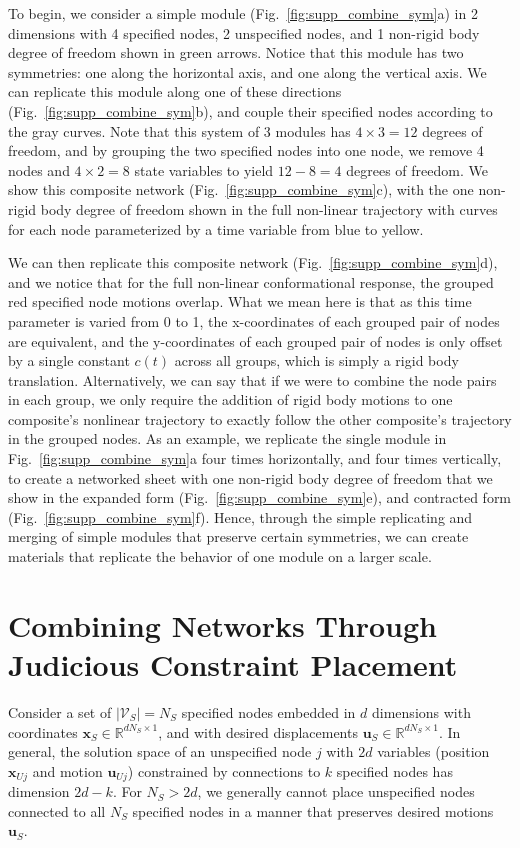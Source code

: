 \documentclass[%
preprint,
 amsmath,amssymb,
 aps,
]{revtex4-1}
\newcommand{\mc}{\mathcal}
\newcommand{\real}{\mathbb{R}}
\begin{document}
To begin, we consider a simple module (Fig.~\ref{fig:supp_combine_sym}a) in 2 dimensions with 4 specified nodes, 2 unspecified nodes, and 1 non-rigid body degree of freedom shown in green arrows. Notice that this module has two symmetries: one along the horizontal axis, and one along the vertical axis. We can replicate this module along one of these directions (Fig.~\ref{fig:supp_combine_sym}b), and couple their specified nodes according to the gray curves. Note that this system of 3 modules has $4 \times 3 = 12$ degrees of freedom, and by grouping the two specified nodes into one node, we remove 4 nodes and $4 \times 2 = 8$ state variables to yield $12 - 8 = 4$ degrees of freedom. We show this composite network (Fig.~\ref{fig:supp_combine_sym}c), with the one non-rigid body degree of freedom shown in the full non-linear trajectory with curves for each node parameterized by a time variable from blue to yellow. 

We can then replicate this composite network (Fig.~\ref{fig:supp_combine_sym}d), and we notice that for the full non-linear conformational response, the grouped red specified node motions overlap. What we mean here is that as this time parameter is varied from 0 to 1, the x-coordinates of each grouped pair of nodes are equivalent, and the y-coordinates of each grouped pair of nodes is only offset by a single constant $c(t)$ across all groups, which is simply a rigid body translation. Alternatively, we can say that if we were to combine the node pairs in each group, we only require the addition of rigid body motions to one composite's nonlinear trajectory to exactly follow the other composite's trajectory in the grouped nodes. As an example, we replicate the single module in Fig.~\ref{fig:supp_combine_sym}a four times horizontally, and four times vertically, to create a networked sheet with one non-rigid body degree of freedom that we show in the expanded form (Fig.~\ref{fig:supp_combine_sym}e), and contracted form (Fig.~\ref{fig:supp_combine_sym}f). Hence, through the simple replicating and merging of simple modules that preserve certain symmetries, we can create materials that replicate the behavior of one module on a larger scale.





\section{Combining Networks Through Judicious Constraint Placement}
Consider a set of $|\mc V_S| = N_S$ specified nodes embedded in $d$ dimensions with coordinates $\bm{x}_S \in \real^{dN_S\times 1}$, and with desired displacements $\bm{u}_{S} \in \real^{dN_S \times 1}$. In general, the solution space of an unspecified node $j$ with $2d$ variables (position $\bm{x}_{Uj}$ and motion $\bm{u}_{Uj}$) constrained by connections to $k$ specified nodes has dimension $2d - k$. For $N_S > 2d$, we generally cannot place unspecified nodes connected to all $N_S$ specified nodes in a manner that preserves desired motions $\bm{u}_S$. 
\end{document}
